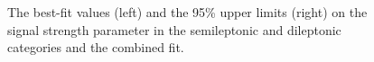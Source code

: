 \begin{figure}
\begin{centering}
\caption[The best-fit value and the 95\% upper limits on the signal strength parameter]{The best-fit values (left) and the 95\% upper limits (right) on the signal strength parameter in the semileptonic and dileptonic categories and the combined fit.}
\label{fig:tth_combined}
\end{centering}
\end{figure}

